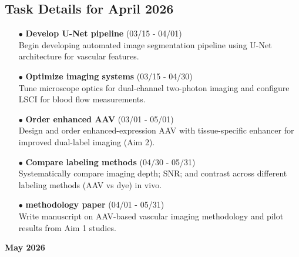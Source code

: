 \documentclass[landscape,a4paper]{article}
\begin{document}
\subsection{Task Details for April 2026}
\begin{itemize}[leftmargin=1cm]
    \item[\textcolor{other}{$\bullet$}] \textbf{Develop U-Net pipeline} (03/15 - 04/01)\\ Begin developing automated image segmentation pipeline using U-Net architecture for vascular features.
    \item[\textcolor{other}{$\bullet$}] \textbf{Optimize imaging systems} (03/15 - 04/30)\\ Tune microscope optics for dual-channel two-photon imaging and configure LSCI for blood flow measurements.
    \item[\textcolor{other}{$\bullet$}] \textbf{Order enhanced AAV} (03/01 - 05/01)\\ Design and order enhanced-expression AAV with tissue-specific enhancer for improved dual-label imaging (Aim 2).
    \item[\textcolor{other}{$\bullet$}] \textbf{Compare labeling methods} (04/30 - 05/31)\\ Systematically compare imaging depth; SNR; and contrast across different labeling methods (AAV vs dye) in vivo.
    \item[\textcolor{researchout}{$\bullet$}] \textbf{methodology paper} (04/01 - 05/31)\\ Write manuscript on AAV-based vascular imaging methodology and pilot results from Aim 1 studies.
\end{itemize}

\newpage
\pagestyle{empty}

\begin{center}
{\large\textbf{May 2026}}
\end{center}

\vspace{0.5cm}
\end{document}
